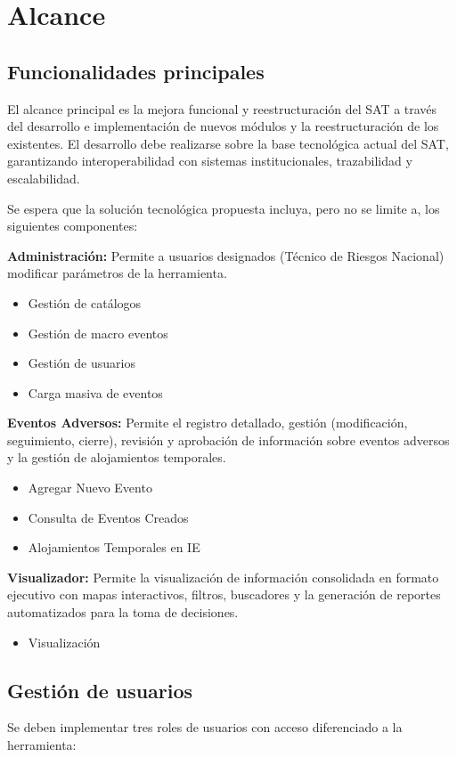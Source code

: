 \section{Alcance}
\subsection{Funcionalidades principales}
El alcance principal es la mejora funcional y reestructuración del SAT a través del desarrollo e implementación de nuevos módulos y la reestructuración de los existentes. El desarrollo debe realizarse sobre la base tecnológica actual del SAT, garantizando interoperabilidad con sistemas institucionales, trazabilidad y escalabilidad.

Se espera que la solución tecnológica propuesta incluya, pero no se limite a, los siguientes componentes:

\textbf{Administración:} Permite a usuarios designados (Técnico de Riesgos Nacional) modificar parámetros de la herramienta.
\begin{itemize}
    \item Gestión de catálogos
    \item Gestión de macro eventos
    \item Gestión de usuarios
    \item Carga masiva de eventos
\end{itemize}

\textbf{Eventos Adversos:} Permite el registro detallado, gestión (modificación, seguimiento, cierre), revisión y aprobación de información sobre eventos adversos y la gestión de alojamientos temporales.
\begin{itemize}
    \item Agregar Nuevo Evento
    \item Consulta de Eventos Creados
    \item Alojamientos Temporales en IE
\end{itemize}

\textbf{Visualizador:} Permite la visualización de información consolidada en formato ejecutivo con mapas interactivos, filtros, buscadores y la generación de reportes automatizados para la toma de decisiones.
\begin{itemize}
    \item Visualización
\end{itemize}

\subsection{Gestión de usuarios}
Se deben implementar tres roles de usuarios con acceso diferenciado a la herramienta:

